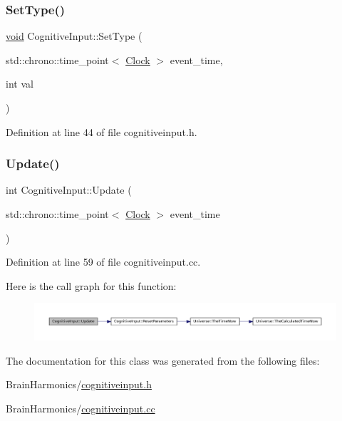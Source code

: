 \subsubsection{\texorpdfstring{Set\+Type()}{SetType()}}
{\footnotesize\ttfamily \mbox{\hyperlink{glad_8h_a950fc91edb4504f62f1c577bf4727c29}{void}} Cognitive\+Input\+::\+Set\+Type (\begin{DoxyParamCaption}\item[{std\+::chrono\+::time\+\_\+point$<$ \mbox{\hyperlink{universe_8h_a0ef8d951d1ca5ab3cfaf7ab4c7a6fd80}{Clock}} $>$}]{event\+\_\+time,  }\item[{int}]{val }\end{DoxyParamCaption})\hspace{0.3cm}{\ttfamily [inline]}}



Definition at line 44 of file cognitiveinput.\+h.

\mbox{\label{class_cognitive_input_a93bd9d88194a545c9a85512edcbb6044}} 
\subsubsection{\texorpdfstring{Update()}{Update()}}
{\footnotesize\ttfamily int Cognitive\+Input\+::\+Update (\begin{DoxyParamCaption}\item[{std\+::chrono\+::time\+\_\+point$<$ \mbox{\hyperlink{universe_8h_a0ef8d951d1ca5ab3cfaf7ab4c7a6fd80}{Clock}} $>$}]{event\+\_\+time }\end{DoxyParamCaption})}



Definition at line 59 of file cognitiveinput.\+cc.

Here is the call graph for this function\+:\nopagebreak
\begin{figure}[H]
\begin{center}
\leavevmode
\includegraphics[width=350pt]{class_cognitive_input_a93bd9d88194a545c9a85512edcbb6044_cgraph}
\end{center}
\end{figure}


The documentation for this class was generated from the following files\+:\begin{DoxyCompactItemize}
\item 
Brain\+Harmonics/\mbox{\hyperlink{cognitiveinput_8h}{cognitiveinput.\+h}}\item 
Brain\+Harmonics/\mbox{\hyperlink{cognitiveinput_8cc}{cognitiveinput.\+cc}}\end{DoxyCompactItemize}
